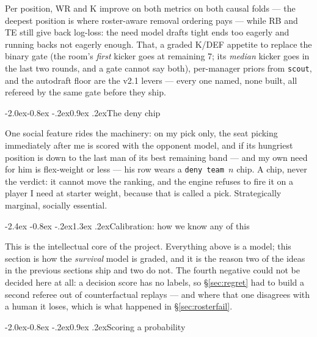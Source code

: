 \documentclass[10pt,a4paper]{article}
\makeatletter
\theoremstyle{plain}
\theoremstyle{definition}
\theoremstyle{remark}
\newcommand{\code}[1]{\texttt{\small #1}}
\renewcommand\section{\@startsection{section}{1}{\z@}%
  {-2.4ex \@plus -0.8ex \@minus -.2ex}{1.3ex \@plus.2ex}{\normalfont\Large\bfseries}}
\renewcommand\subsection{\@startsection{subsection}{2}{\z@}%
  {-2.0ex\@plus -0.8ex \@minus -.2ex}{0.9ex \@plus .2ex}{\normalfont\large\bfseries}}
\makeatother
\begin{document}
Per position, WR and K improve on both metrics on both causal folds --- the deepest
position is where roster-aware removal ordering pays --- while RB and TE still give back
log-loss: the need model drafts tight ends too eagerly and running backs not eagerly
enough. That, a graded K/DEF appetite to replace the binary gate (the room's \emph{first}
kicker goes at remaining 7; its \emph{median} kicker goes in the last two rounds, and a
gate cannot say both), per-manager priors from \code{scout}, and the autodraft floor are
the v2.1 levers --- every one named, none built, all refereed by the same gate before they
ship.

\subsection{The deny chip}

One social feature rides the machinery: on my pick only, the seat picking immediately
after me is scored with the opponent model, and if its hungriest position is down to the
last man of its best remaining band --- and my own need for him is flex-weight or less ---
his row wears a \code{deny team $n$} chip. A chip, never the verdict: it cannot move the
ranking, and the engine refuses to fire it on a player I need at starter weight, because
that is called a pick. Strategically marginal, socially essential.

\section{Calibration: how we know any of this}
\label{sec:calibration}

This is the intellectual core of the project. Everything above is a model; this section
is how the \emph{survival} model is graded, and it is the reason two of the ideas in the
previous sections ship and two do not. The fourth negative could not be decided here at
all: a decision score has no labels, so \S\ref{sec:regret} had to build a second referee
out of counterfactual replays --- and where that one disagrees with a human it loses,
which is what happened in \S\ref{sec:rosterfail}.

\subsection{Scoring a probability}
\end{document}
